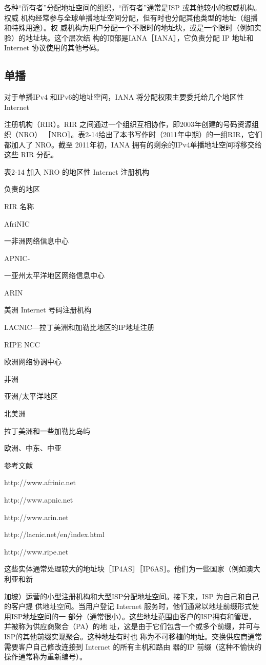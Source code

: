 各种“所有者”分配地址空间的组织，“所有者”通常是ISP 或其他较小的权威机构。权威
机构经常参与全球单播地址空间分配，但有时也分配其他类型的地址（组播和特殊用途）。权
威机构为用户分配一个不限时的地址块，或是一个限时（例如实验）的地址块。这个层次结
构的顶部是IANA［IANA］，它负责分配 IP 地址和 Internet 协议使用的其他号码。

\subsection{单播}
对于单播IPv4 和IPv6的地址空间，IANA 将分配权限主要委托给几个地区性 Internet

注册机构（RIR）。RIR 之间通过一个组织互相协作，即2003年创建的号码资源组织（NRO）
［NRO］。表2-14给出了本书写作时（2011年中期）的一组RIR，它们都加人了 NRO。截至
2011年初，IANA 拥有的剩余的IPv4单播地址空间将移交给这些 RIR 分配。

表2-14 加入 NRO 的地区性 Internet 注册机构

负责的地区

RIR 名称

AfriNIC

一非洲网络信息中心

APNIC-

一亚州太平洋地区网络信息中心

ARIN

美洲 Internet 号码注册机构

LACNIC—拉丁美洲和加勒比地区的IP地址注册

RIPE NCC

欧洲网络协调中心

非洲

亚洲/太平洋地区

北美洲

拉丁美洲和一些加勒比岛屿

欧洲、中东、中亚

参考文献

http://www.afrinic.net

http://www.apnic.net

http://www.arin.net

http://lacnic.net/en/index.html

http://www.ripe.net

这些实体通常处理较大的地址块［IP4AS］［IP6AS］。他们为一些国家（例如澳大利亚和新

加坡）运营的小型注册机构和大型ISP分配地址空间。接下来，ISP 为自己和自己的客户提
供地址空间。当用户登记 Internet 服务时，他们通常以地址前缀形式使用ISP地址空间的一
部分（通常很小）。这些地址范围由客户的ISP拥有和管理，并被称为供应商聚合（PA）的地
址，这是由于它们包含一个或多个前缀，并可与ISP的其他前缀实现聚合。这种地址有时也
称为不可移植的地址。交换供应商通常需要客户自己修改连接到 Internet 的所有主机和路由
器的IP 前缀（这种不愉快的操作通常称为重新编号）。


